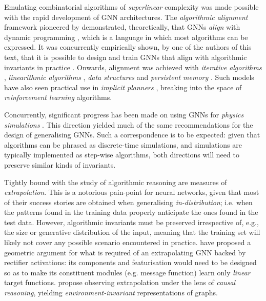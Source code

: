 Emulating combinatorial algorithms of \emph{superlinear} complexity was made possible with the rapid development of GNN architectures. The \emph{algorithmic alignment} framework pioneered by \citet{xu2019can} demonstrated, theoretically,  that GNNs \emph{align} with dynamic programming \citep{bellman1966dynamic}, which is a language in which most algorithms can be expressed. It was concurrently empirically shown, by one of the authors of this text, that it is possible to design and train GNNs that align with algorithmic invariants in practice \citep{velivckovic2019neural}. Onwards, alignment was achieved with \emph{iterative algorithms} \citep{tang2020towards}, \emph{linearithmic algorithms} \citep{freivalds2019neural}, \emph{data structures} \citep{velivckovic2020pointer} and \emph{persistent memory} \citep{strathmann2021persistent}. Such models have also seen practical use in \emph{implicit planners} \citep{deac2020xlvin}, breaking into the space of \emph{reinforcement learning} algorithms.

Concurrently, significant progress has been made on using GNNs for \emph{physics simulations} \citep{sanchez2020learning,pfaff2020learning}. This direction yielded much of the same recommendations for the design of generalising GNNs. Such a correspondence is to be expected: given that algorithms can be phrased as discrete-time simulations, and simulations are typically implemented as step-wise algorithms, both directions will need to preserve similar kinds of invariants.

Tightly bound with the study of algorithmic reasoning are measures of \emph{extrapolation}. This is a notorious pain-point for neural networks, given that most of their success stories are obtained when  generalising \emph{in-distribution}; i.e. when the patterns found in the training data properly anticipate the ones found in the test data. However, algorithmic invariants must be preserved irrespective of, e.g., the size or generative distribution of the input, meaning that the training set will likely not cover any possible scenario encountered in practice. \citet{xu2020neural} have proposed a geometric argument for what is required of an extrapolating GNN backed by rectifier activations: its components and featurisation would need to be designed so as to make its constituent modules (e.g. message function) learn only \emph{linear} target functions. \citet{bevilacqua2021size} propose observing extrapolation under the lens of \emph{causal reasoning}, yielding \emph{environment-invariant} representations of graphs.

